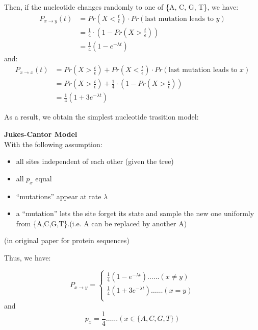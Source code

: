 \documentclass[12pt]{book}
\begin{document}
        Then, if the nucleotide changes randomly to one of \{A, C, G, T\}, we have:
        \begin{align*}
            P_{x \rightarrow y}(t) &= Pr(X < \frac{t}{\epsilon}) \cdot Pr(\text{last mutation leads to $y$})\\
            &= \frac{1}{4} \cdot (1-Pr(X > \frac{t}{\epsilon}))\\
            &= \frac{1}{4} \left( 1- e ^{- \lambda t} \right)
        \end{align*}
        and:
        \begin{align*}
            P_{x \rightarrow x}(t) &= Pr(X > \frac{t}{\epsilon}) + Pr(X < \frac{t}{\epsilon}) \cdot Pr(\text{last mutation leads to $x$})\\
            &= Pr(X > \frac{t}{\epsilon}) + \frac{1}{4} \cdot (1-Pr(X > \frac{t}{\epsilon}))\\
            &= \frac{1}{4} \left( 1 + 3 e ^{- \lambda t} \right)
        \end{align*}

        As a result, we obtain the simplest nucleotide trasition model:

            \begin{defn}{\textbf{Jukes-Cantor Model}}\\
                With the following assumption:

                \begin{itemize}
                    \item all sites independent of each other (given the tree)
                    \item all $p_x$ equal
                    \item “mutations” appear at rate $\lambda$
                    \item a “mutation” lets the site forget its state and sample the new one uniformly from \{A,C,G,T\}.(i.e. A can be replaced by another A)
                \end{itemize}

                (in original paper for protein sequences)

                Thus, we have:

                \begin{equation*}
                    P_{x \rightarrow y} = 
                    \begin{cases}
                        \frac{1}{4} \left( 1- e ^{- \lambda t} \right) \dots\dots (x \neq y)\\
                        \frac{1}{4} \left( 1 + 3 e ^{- \lambda t} \right) \dots\dots (x = y)\\
                    \end{cases}
                \end{equation*}
                and
                \begin{equation*}
                    p_x = \frac{1}{4} \dots\dots(x \in \{ A, C, G, T \})
                \end{equation*}
            \end{defn}
\end{document}
